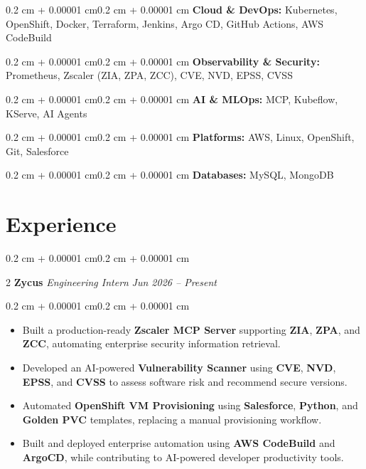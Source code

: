 \documentclass[10pt, letterpaper]{article}
\newenvironment{highlights}{\begin{itemize}[topsep=0.10 cm,parsep=0.10 cm,partopsep=0pt,itemsep=0pt,leftmargin=0.4 cm + 10pt]}{\end{itemize}}
\newenvironment{onecolentry}{\begin{adjustwidth}{0.2 cm + 0.00001 cm}{0.2 cm + 0.00001 cm}}{\end{adjustwidth}}
\newenvironment{twocolentry}[2][]{\onecolentry\def\secondColumn{#2}\setcolumnwidth{\fill, 4.5 cm}\begin{paracol}{2}}{\switchcolumn \raggedleft \secondColumn\end{paracol}\endonecolentry}
\begin{document}
\begin{onecolentry}
\textbf{Cloud \& DevOps:} Kubernetes, OpenShift, Docker, Terraform, Jenkins, Argo CD, GitHub Actions, AWS CodeBuild
\end{onecolentry}

\begin{onecolentry}
\textbf{Observability \& Security:} Prometheus, Zscaler (ZIA, ZPA, ZCC), CVE, NVD, EPSS, CVSS
\end{onecolentry}

\begin{onecolentry}
\textbf{AI \& MLOps:} MCP, Kubeflow, KServe, AI Agents
\end{onecolentry}

\begin{onecolentry}
\textbf{Platforms:} AWS, Linux, OpenShift, Git, Salesforce
\end{onecolentry}

\begin{onecolentry}
\textbf{Databases:} MySQL, MongoDB
\end{onecolentry}
\section{Experience}

\begin{twocolentry}{\textit{Jun 2026 -- Present}}
\textbf{Zycus}
\textit{\newline Engineering Intern}
\end{twocolentry}

\begin{onecolentry}
\begin{highlights}

\item Built a production-ready \textbf{Zscaler MCP Server} supporting \textbf{ZIA}, \textbf{ZPA}, and \textbf{ZCC}, automating enterprise security information retrieval.

\item Developed an AI-powered \textbf{Vulnerability Scanner} using \textbf{CVE}, \textbf{NVD}, \textbf{EPSS}, and \textbf{CVSS} to assess software risk and recommend secure versions.

\item Automated \textbf{OpenShift VM Provisioning} using \textbf{Salesforce}, \textbf{Python}, and \textbf{Golden PVC} templates, replacing a manual provisioning workflow.

\item Built and deployed enterprise automation using \textbf{AWS CodeBuild} and \textbf{ArgoCD}, while contributing to AI-powered developer productivity tools.

\end{highlights}
\end{onecolentry}
\end{document}
